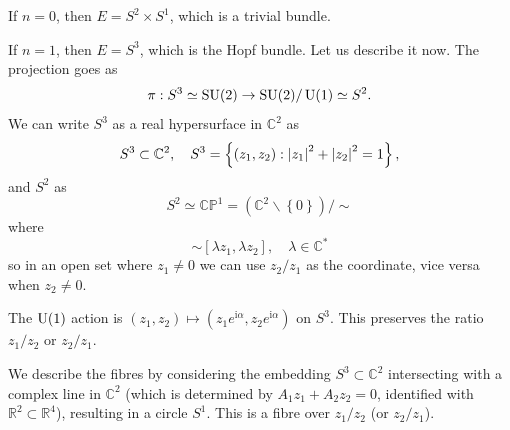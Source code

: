 \documentclass[a4paper,11pt]{article}
\begin{document}
\begin{ex}
        If $n=0$, then $E = S^2 \times S^1$, which is a trivial bundle.

        If $n=1$, then $E = S^3$, which is the Hopf bundle. Let us describe it now. The projection goes as
        \begin{equation}
            \pi : S^3 \simeq \operatorname{SU}(2) \to \operatorname{SU}(2) / \operatorname{U}(1) \simeq S^2.
        \end{equation}
        We can write $S^3$ as a real hypersurface in $\mathbb{C}^2$ as 
        \begin{equation}
            S^3 \subset \mathbb{C}^2, \quad S^3 = \left\{ (z_1,z_2) : \abs{z_1}^2 + \abs{z_2}^2 = 1 \right\},
        \end{equation}
        and $S^2$ as 
        \begin{equation}
            S^2 \simeq \mathbb{CP}^1 = (\mathbb{C}^2 \backslash \left\{ 0 \right\}) / \sim 
        \end{equation}
        where 
        \begin{equation}
            [z_1, z_2] \sim [\lambda z_1, \lambda z_2], \quad \lambda \in \mathbb{C}^*
        \end{equation}
        so in an open set where $z_1 \neq 0$ we can use $z_2 / z_1$ as the coordinate, vice versa when $z_2 \neq 0$.

        The $\operatorname{U}(1)$ action is $(z_1, z_2) \mapsto (z_1 e^{\mathrm{i} \alpha}, z_2 e^{\mathrm{i} \alpha})$ on $S^3$. This preserves the ratio $z_1 / z_2$ or $z_2 / z_1$.

        We describe the fibres by considering the embedding $S^3 \subset \mathbb{C}^2$ intersecting with a complex line in $\mathbb{C}^2$ (which is determined by $A_1 z_1 + A_2 z_2 = 0$, identified with $\mathbb{R}^2 \subset \mathbb{R}^4$), resulting in a circle $S^1$. This is a fibre over $z_1 / z_2$ (or $z_2 / z_1$).
    \end{ex}
\end{document}
